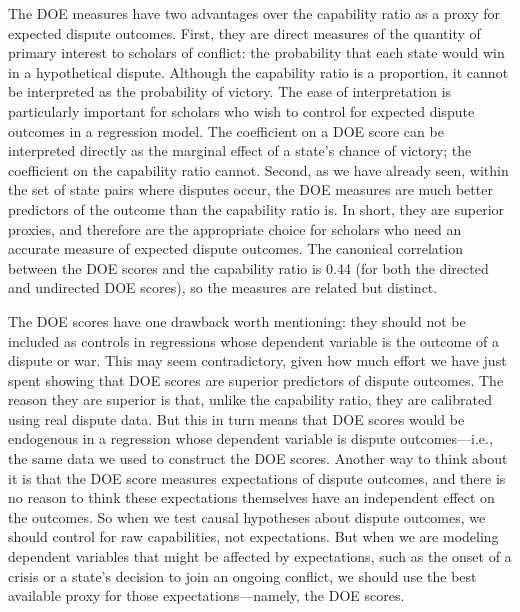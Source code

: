 The DOE measures have two advantages over the capability ratio as a proxy for expected dispute outcomes.
First, they are direct measures of the quantity of primary interest to scholars of conflict: the probability that each state would win in a hypothetical dispute.
Although the capability ratio is a proportion, it cannot be interpreted as the probability of victory.
The ease of interpretation is particularly important for scholars who wish to control for expected dispute outcomes in a regression model.
The coefficient on a DOE score can be interpreted directly as the marginal effect of a state's chance of victory; the coefficient on the capability ratio cannot.
Second, as we have already seen, within the set of state pairs where disputes occur, the DOE measures are much better predictors of the outcome than the capability ratio is.
In short, they are superior proxies, and therefore are the appropriate choice for scholars who need an accurate measure of expected dispute outcomes.
The canonical correlation between the DOE scores and the capability ratio is 0.44 (for both the directed and undirected DOE scores), so the measures are related but distinct.

The DOE scores have one drawback worth mentioning: they should not be included as controls in regressions whose dependent variable is the outcome of a dispute or war.
This may seem contradictory, given how much effort we have just spent showing that DOE scores are superior predictors of dispute outcomes.
The reason they are superior is that, unlike the capability ratio, they are calibrated using real dispute data.
But this in turn means that DOE scores would be endogenous in a regression whose dependent variable is dispute outcomes---i.e., the same data we used to construct the DOE scores.
Another way to think about it is that the DOE score measures expectations of dispute outcomes, and there is no reason to think these expectations themselves have an independent effect on the outcomes.
So when we test causal hypotheses about dispute outcomes, we should control for raw capabilities, not expectations.
But when we are modeling dependent variables that might be affected by expectations, such as the onset of a crisis or a state's decision to join an ongoing conflict, we should use the best available proxy for those expectations---namely, the DOE scores.

